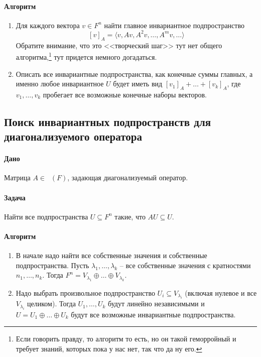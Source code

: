 \documentclass{article}
\newcommand{\Matrix}[2]{\mathop{\mathrm{M}_{#2}}(#1)}
\begin{document}
\paragraph{Алгоритм}
\begin{enumerate}
\item Для каждого вектора $v\in F^n$ найти главное инвариантное подпространство
\[
[v]_A = \langle v, Av, A^2v, \ldots, A^mv, \ldots\rangle
\]
Обратите внимание, что это <<творческий шаг>> тут нет общего алгоритма,\footnote{Если говорить правду, то алгоритм то есть, но он такой геморройный и требует знаний, которых пока у нас нет, так что да ну его.} тут придется немного догадаться.

\item Описать все инвариантные подпространства, как конечные суммы главных, а именно любое инвариантное $U$ будет иметь вид $[v_1]_A + \ldots +[v_k]_A$, где $v_1,\ldots, v_k$ пробегает все возможные конечные наборы векторов.
\end{enumerate}

\subsection{Поиск инвариантных подпространств для диагонализуемого оператора}

\paragraph{Дано} Матрица $A\in\Matrix{F}{n}$, задающая диагонализуемый оператор.

\paragraph{Задача} Найти все подпространства $U\subseteq F^n$ такие, что $A U \subseteq U$.

\paragraph{Алгоритм}
\begin{enumerate}
\item В начале надо найти все собственные значения и собственные подпространства. Пусть $\lambda_1,\ldots, \lambda_k$ -- все собственные значения с кратностями $n_1,\ldots,n_k$. Тогда $F^n = V_{\lambda_1}\oplus \ldots \oplus V_{\lambda_k}$.

\item Надо выбрать произвольное подпространство $U_i\subseteq V_{\lambda_i}$ (включая нулевое и все $V_{\lambda_i}$ целиком). Тогда $U_1,\ldots, U_k$ будут линейно независимыми и $U = U_1 \oplus \ldots \oplus U_k$ будут все возможные инвариантные подпространства.
\end{enumerate}
\end{document}
